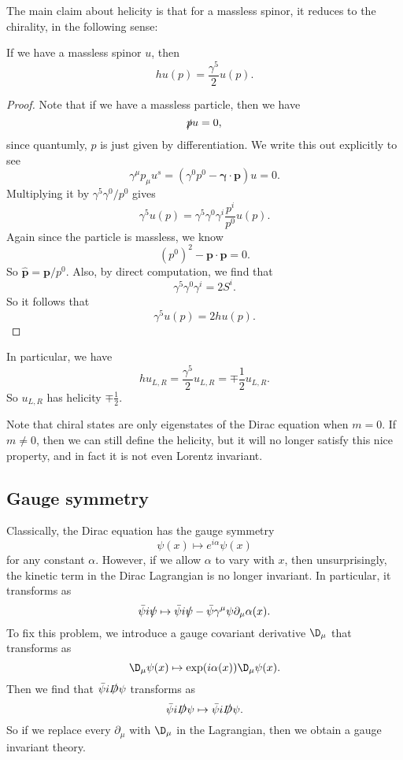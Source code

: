 \documentclass[a4paper]{article}
\begin{document}
The main claim about helicity is that for a massless spinor, it reduces to the chirality, in the following sense:
\begin{prop}
  If we have a massless spinor $u$, then
  \[
    hu(p) = \frac{\gamma^5}{2} u(p).
  \]
\end{prop}

\begin{proof}
  Note that if we have a massless particle, then we have
  \[
    \slashed p u = 0,
  \]
  since quantumly, $p$ is just given by differentiation. We write this out explicitly to see
  \[
    \gamma^\mu p_\mu u^s = (\gamma^0 p^0 - \boldsymbol \gamma \cdot \mathbf{p})u = 0.
  \]
  Multiplying it by $\gamma^5 \gamma^0/p^0$ gives
  \[
    \gamma^5 u(p) = \gamma^5 \gamma^0 \gamma^i \frac{p^i}{p^0} u(p).
  \]
  Again since the particle is massless, we know
  \[
    (p^0)^2 - \mathbf{p}\cdot \mathbf{p} = 0.
  \]
  So $\hat{\mathbf{p}} = \mathbf{p}/p^0$. Also, by direct computation, we find that
  \[
    \gamma^5 \gamma^0 \gamma^i = 2 S^i.
  \]
  So it follows that
  \[
    \gamma^5 u(p) = 2 h u(p).
  \]
\end{proof}
In particular, we have
\[
  h u_{L, R} = \frac{\gamma^5}{2} u_{L, R} = \mp \frac{1}{2} u_{L, R}.
\]
So $u_{L, R}$ has helicity $\mp\frac{1}{2}$.

Note that chiral states are only eigenstates of the Dirac equation when $m = 0$. If $m \not= 0$, then we can still define the helicity, but it will no longer satisfy this nice property, and in fact it is not even Lorentz invariant.

\subsection{Gauge symmetry}
Classically, the Dirac equation has the gauge symmetry
\[
  \psi(x) \mapsto e^{i\alpha}\psi(x)
\]
for any constant $\alpha$. However, if we allow $\alpha$ to vary with $x$, then unsurprisingly, the kinetic term in the Dirac Lagrangian is no longer invariant. In particular, it transforms as
\[
  \bar\psi i \slashed{\psi} \mapsto \bar\psi i \slashed \psi - \bar\psi \gamma^\mu \psi \partial_\mu \alpha (x).
\]
To fix this problem, we introduce a gauge covariant derivative $\D_\mu$ that transforms as
\[
  \D_\mu \psi(x) \mapsto \exp(i\alpha (x)) \D_\mu \psi(x).
\]
Then we find that $\bar\psi i \slashed D \psi$ transforms as
\[
  \bar\psi i \slashed D \psi \mapsto \bar\psi i \slashed D \psi.
\]
So if we replace every $\partial_\mu$ with $\D_\mu$ in the Lagrangian, then we obtain a gauge invariant theory.
\end{document}
